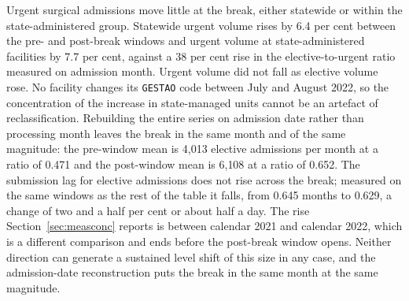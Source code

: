 Urgent surgical admissions move little at the break, either statewide or within
the state-administered group. Statewide urgent volume rises by 6.4 per cent
between the pre- and post-break windows and urgent volume at state-administered
facilities by 7.7 per cent, against a 38 per cent rise in the elective-to-urgent
ratio measured on admission month. Urgent volume did not fall as elective volume rose. No facility
changes its \texttt{GESTAO} code between July and August 2022, so the
concentration of the increase in state-managed units cannot be an artefact of
reclassification. Rebuilding the entire series on admission date rather than
processing month leaves the break in the same month and of the same magnitude:
the pre-window mean is 4{,}013 elective admissions per month at a ratio of
0.471 and the post-window mean is 6{,}108 at a ratio of 0.652. The submission
lag for elective admissions does not rise across the break; measured on the same
windows as the rest of the table it falls, from 0.645 months to 0.629, a change
of two and a half per cent or about half a day. The rise Section~\ref{sec:measconc} reports is between calendar 2021 and calendar 2022, which is a different
comparison and ends before the post-break window opens. Neither direction can
generate a sustained level shift of this size in any case, and the
admission-date reconstruction puts the break in the same month at the same
magnitude.

\begin{table}[t]
\centering
\caption{Falsification checks. Each row reports a quantity that would have
moved if the corresponding alternative explanation were correct.}
\label{tab:falsification}

\end{table}

